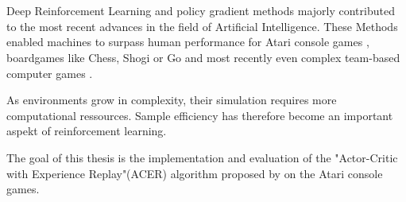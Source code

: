 \section*{}
Deep Reinforcement Learning and policy gradient methods majorly contributed to the most recent advances in the field of Artificial Intelligence.
These Methods enabled machines to surpass human performance for Atari console games \citep{mnih2015atari}, boardgames like Chess, Shogi \citep{Shogi17} or Go \citep{Go2017} and most recently even complex team-based computer games \citep{OpenAI_dota}.

As environments grow in complexity, their simulation requires more computational ressources.
Sample efficiency has therefore become an important aspekt of reinforcement learning.

The goal of this thesis is the implementation and evaluation of the "Actor-Critic with Experience Replay"(ACER) algorithm proposed by \cite{ACER} on the Atari console games.